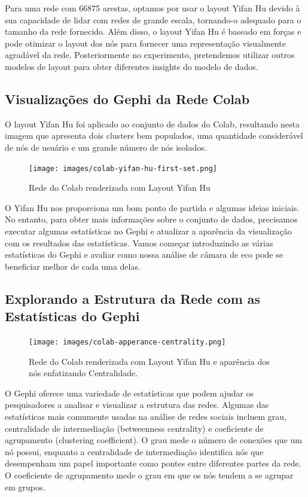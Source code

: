 Para uma rede com 66875 arestas, optamos por usar o layout Yifan Hu devido à sua capacidade de lidar com redes de grande escala, tornando-o adequado para o tamanho da rede fornecido. Além disso, o layout Yifan Hu é baseado em forças e pode otimizar o layout dos nós para fornecer uma representação visualmente agradável da rede. Posteriormente no experimento, pretendemos utilizar outros modelos de layout para obter diferentes insights do modelo de dados.

\subsection*{Visualizações do Gephi da Rede Colab}

O layout Yifan Hu foi aplicado ao conjunto de dados do Colab, resultando nesta imagem que apresenta dois clusters bem populados, uma quantidade considerável de nós de usuário e um grande número de nós isolados.

\begin{figure}[!hbtp]
	\caption{Rede do Colab renderizada com Layout Yifan Hu}
	\label{fig:colab_yifan_hu_first_set}
	\centering
	\texttt{[image: images/colab-yifan-hu-first-set.png]}
\end{figure}

O Yifan Hu nos proporciona um bom ponto de partida e algumas ideias iniciais. No entanto, para obter mais informações sobre o conjunto de dados, precisamos executar algumas estatísticas no Gephi e atualizar a aparência da visualização com os resultados das estatísticas. Vamos começar introduzindo as várias estatísticas do Gephi e avaliar como nossa análise de câmara de eco pode se beneficiar melhor de cada uma delas.

\subsection*{Explorando a Estrutura da Rede com as Estatísticas do Gephi}

\begin{figure}[!htb]
	\caption{Rede do Colab renderizada com Layout Yifan Hu e aparência dos nós enfatizando Centralidade.}
	\label{fig:colab_apperance_centrality}
	\centering
	\texttt{[image: images/colab-apperance-centrality.png]}
	\fautor
\end{figure}

O Gephi oferece uma variedade de estatísticas que podem ajudar os pesquisadores a analisar e visualizar a estrutura das redes. Algumas das estatísticas mais comumente usadas na análise de redes sociais incluem grau, centralidade de intermediação (betweenness centrality) e coeficiente de agrupamento (clustering coefficient). O grau mede o número de conexões que um nó possui, enquanto a centralidade de intermediação identifica nós que desempenham um papel importante como pontes entre diferentes partes da rede. O coeficiente de agrupamento mede o grau em que os nós tendem a se agrupar em grupos.

